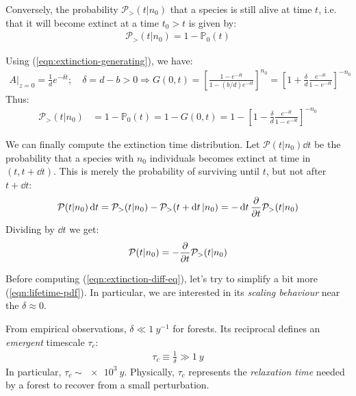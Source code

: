\documentclass[../../main.tex]{subfiles}
\begin{document}
Conversely, the probability $\mathcal{P}_>(t|n_0)$ that a species is still alive at time $t$, i.e. that it will become extinct at a time $t_0 > t$ is given by:
\begin{align*}
    \mathcal{P}_>(t|n_0) = 1 - \mathbb{P}_0(t)
\end{align*}

Using (\ref{eqn:extinction-generating}), we have:
\begin{align*}
    A\Big|_{z=0} = \frac{1}{d} e^{-\delta t}; \quad \delta = d-b > 0  \Rightarrow G(0,t) = \left[\frac{1 - e^{-\delta t}}{1 - (b/d) e^{-\delta t}} \right]^{n_0} = \left[1 + \frac{\delta}{d} \frac{e^{-\delta t}}{1 - e^{-\delta t}}  \right]^{-n_0}
\end{align*}
Thus:
\begin{align}\label{eqn:lifetime-pdf}
    \mathcal{P}_>(t|n_0) &= 1- \mathbb{P}_0(t) = 1 - G(0,t) = 1 - \left[1- \frac{\delta}{d} \frac{e^{-\delta t}}{1 - e^{-\delta t}}  \right]^{-n_0}
\end{align}

We can finally compute the extinction time distribution. Let $\mathcal{P}(t|n_0) \dd{t}$ be the probability that a species with $n_0$ individuals becomes extinct at time in $(t, t+ \dd{t})$. This is merely the probability of surviving until $t$, but not after $t+ \dd{t}$:
\begin{align}\label{eqn:lifetime-derivative}
    \mathcal{P}(t|n_0)\dd{t} = \mathcal{P}_>(t|n_0) - \mathcal{P}_>(t+\dd{t}|n_0) = - \dd{t} \pdv{t} \mathcal{P}_>(t|n_0)
\end{align}
Dividing by $\dd{t}$ we get:
\begin{align}\label{eqn:extinction-diff-eq}
    \mathcal{P}(t|n_0) = -\pdv{t} \mathcal{P}_>(t|n_0)
\end{align}


Before computing (\ref{eqn:extinction-diff-eq}), let's try to simplify a bit more (\ref{eqn:lifetime-pdf}). In particular, we are interested in its \textit{scaling behaviour} near the  $\delta \approx 0$.

\medskip

From empirical observations, $\delta \ll \SI{1}{y^{-1}}$ for forests. Its reciprocal defines an \textit{emergent} timescale $\tau_c$:
\begin{align}\label{eqn:tau-c}
    \tau_c \equiv \frac{1}{\delta}  \gg \SI{1}{y}
\end{align} 
In particular, $\tau_c \sim \SI{e3}{y}$. Physically, $\tau_c$ represents the \textit{relaxation time} needed by a forest to recover from a small perturbation. 
\end{document}
